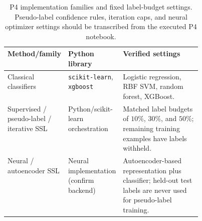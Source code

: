 \begin{table}[!htbp]\centering\footnotesize
\caption{P4 implementation families and fixed label-budget settings. Pseudo-label confidence rules, iteration caps, and neural optimizer settings should be transcribed from the executed P4 notebook.}\label{tab:p4impl}
\begin{tabularx}{\linewidth}{@{}p{0.24\linewidth}p{0.21\linewidth}X@{}}\toprule
\textbf{Method/family} & \textbf{Python library} & \textbf{Verified settings}\\\midrule
Classical classifiers & \texttt{scikit-learn}, \texttt{xgboost} & Logistic regression, RBF SVM, random forest, XGBoost.\\
Supervised / pseudo-label / iterative SSL & Python/scikit-learn orchestration & Matched label budgets of $10\%$, $30\%$, and $50\%$; remaining training examples have labels withheld.\\
Neural / autoencoder SSL & Neural implementation (confirm backend) & Autoencoder-based representation plus classifier; held-out test labels are never used for pseudo-label training.\\
\bottomrule\end{tabularx}
\end{table}
